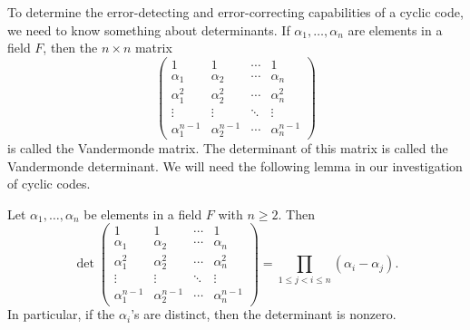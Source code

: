 \medskip

To determine the error-detecting and error-correcting capabilities of a cyclic code, we need to know something about determinants.  If $\alpha_1, \ldots, \alpha_n$ are elements in a field $F$, then the $n 
\times n$ matrix  
$$
\left(
\begin{array}{cccc}
1          & 1          & \cdots & 1 \\
\alpha_1   & \alpha_2   & \cdots & \alpha_n \\
\alpha_1^2 & \alpha_2^2 & \cdots & \alpha_n^2 \\
\vdots     & \vdots     & \ddots & \vdots \\
\alpha_1^{n-1} & \alpha_2^{n-1} & \cdots & \alpha_n^{n-1} 
\end{array}
\right)
$$
is called the {\bfi Vandermonde matrix}.  The
determinant of this matrix is called the {\bfi Vandermonde determinant}.  We will need the following lemma in our investigation of cyclic codes.

\begin{lemma}
Let $\alpha_1, \ldots, \alpha_n$ be elements in a field $F$ with $n \geq 2$.  Then
$$
\det
\left(
\begin{array}{cccc}
1              & 1              & \cdots & 1 \\
\alpha_1       & \alpha_2       & \cdots & \alpha_n \\
\alpha_1^2     & \alpha_2^2     & \cdots & \alpha_n^2 \\
\vdots         & \vdots         & \ddots & \vdots \\
\alpha_1^{n-1} & \alpha_2^{n-1} & \cdots & \alpha_n^{n-1} 
\end{array}
\right)
= 
\prod_{1 \leq j < i \leq n} (\alpha_i - \alpha_j).
$$
In particular, if the $\alpha_i$'s are distinct, then the determinant is nonzero.
\end{lemma}


